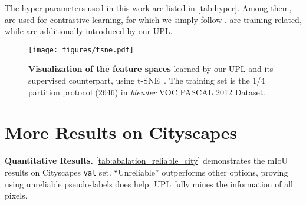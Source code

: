 \documentclass[10pt, twocolumn, letterpaper]{article}
\begin{document}
The hyper-parameters used in this work are listed in \cref{tab:hyper}. Among them,  are used for contrastive learning, for which we simply follow \cite{reco}.  are training-related, while  are additionally introduced by our UPL. 


\vspace{-5pt}
\begin{table}[!ht]
    \setlength{\tabcolsep}{7pt}
    \centering
    \caption{
        \textbf{Summary of hyper-parameters} used in UPL.
    }
    \label{tab:hyper}
    \vspace{-8pt}
    \vspace{-5pt}
\end{table}


\begin{figure*}[t]
    \centering
    \texttt{[image: figures/tsne.pdf]}
    \vspace{-25pt}
    \caption{
        \textbf{Visualization of the feature spaces} learned by our UPL and its supervised counterpart, using t-SNE~\cite{tsne}.
The training set is the 1/4 partition protocol (2646) in \textit{blender} VOC PASCAL 2012 Dataset.
    }
    \label{fig:tsne}
    \vspace{-5pt}
\end{figure*}


\section{More Results on Cityscapes}
\label{sec:morecityscapes}


\noindent \textbf{Quantitative Results.} \cref{tab:abalation_reliable_city} demonstrates the mIoU results on Cityscapes \texttt{val} set.
``Unreliable'' outperforms other options, proving using unreliable pseudo-labels does help.
UPL fully mines the information of all pixels.
\end{document}
